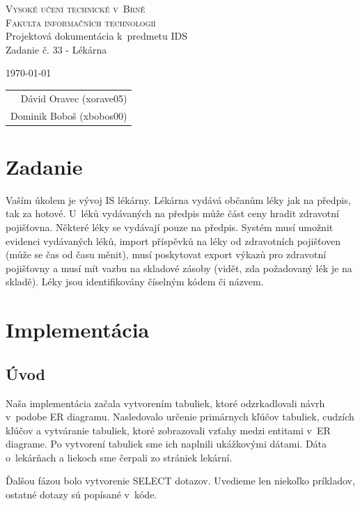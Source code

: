 \documentclass[a4paper, 11pt]{article}
\begin{document}
	\begin{titlepage}
		\begin{center}
			\Huge
			\textsc{Vysoké učení technické v~Brně} \\
			\huge
			\textsc{Fakulta informačních technologií} \\
			\LARGE
			Projektová dokumentácia k~predmetu IDS \\
			\Huge
			Zadanie č. 33 - Lékárna
		\end{center}

		{\Large
			\today
			\hfill
			\begin{tabular}{r}
			Dávid Oravec (xorave05) \\
			Dominik Boboš (xbobos00)
			\end{tabular}
		}
	\end{titlepage}
	\newpage
	\section{Zadanie}
	Vaším úkolem je vývoj IS lékárny. Lékárna vydává občanům léky jak na předpis, tak za hotové. U~léků vydávaných na předpis může část ceny hradit zdravotní pojišťovna. Některé léky se vydávají pouze na předpis. Systém musí umožnit evidenci vydávaných léků, import příspěvků na léky od zdravotních pojišťoven (může se čas od času měnit), musí poskytovat export výkazů pro zdravotní pojišťovny a musí mít vazbu na skladové zásoby (vidět, zda požadovaný lék je na skladě). Léky jsou identifikovány číselným kódem či názvem.
	\section{Implementácia}
	\subsection{Úvod}
	\par Naša implementácia začala vytvorením tabuliek, ktoré odzrkadlovali návrh v~podobe ER diagramu. Nasledovalo určenie primárnych kľúčov tabuliek, cudzích kľúčov a vytváranie tabuliek, ktoré zobrazovali vzťahy medzi entitami v~ER diagrame. Po vytvorení tabuliek sme ich naplnili ukážkovými dátami. Dáta o~lekárňach a liekoch sme čerpali zo strániek lekární. \\
	\par Ďalšou fázou bolo vytvorenie SELECT dotazov. Uvedieme len niekoľko príkladov, ostatné dotazy sú popísané v~kóde.
\end{document}
